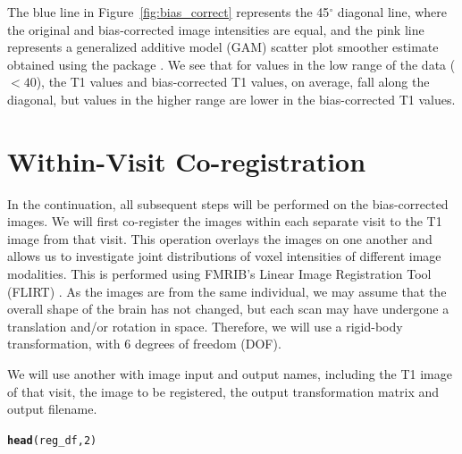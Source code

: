 \documentclass[a4paper]{report}\usepackage[]{graphicx}\usepackage[]{color}
\makeatletter
\newcommand{\hlnum}[1]{\textcolor[rgb]{0.686,0.059,0.569}{#1}}%
\newcommand{\hlstd}[1]{\textcolor[rgb]{0.345,0.345,0.345}{#1}}%
\newcommand{\hlkwd}[1]{\textcolor[rgb]{0.737,0.353,0.396}{\textbf{#1}}}%
\newenvironment{kframe}{%
 \def\at@end@of@kframe{}%
 \ifinner\ifhmode%
  \def\at@end@of@kframe{\end{minipage}}%
  \begin{minipage}{\columnwidth}%
 \fi\fi%
 \def\FrameCommand##1{\hskip\@totalleftmargin \hskip-\fboxsep
 \colorbox{shadecolor}{##1}\hskip-\fboxsep
     \hskip-\linewidth \hskip-\@totalleftmargin \hskip\columnwidth}%
 \MakeFramed {\advance\hsize-\width
   \@totalleftmargin\z@ \linewidth\hsize
   \@setminipage}}%
 {\par\unskip\endMakeFramed%
 \at@end@of@kframe}
\newenvironment{knitrout}{}{} %
\newcommand{\CRANpkg}[1]{\href{http://CRAN.R-project.org/package=#1}{\pkg{#1}}}%
\let\pkg=\strong
\DeclareRobustCommand\code{\bgroup\@noligs\@codex}
\makeatother
\begin{document}
\begin{article}
The blue line in Figure~\ref{fig:bias_correct}\protect{} represents the 45$^{\circ}$ diagonal line, where the original and bias-corrected image intensities are equal, and the pink line represents a generalized additive model (GAM) \citep{hastie_generalized_1990} scatter plot smoother estimate obtained using the \CRANpkg{mgcv} package \citep{wood_fast_2011}.  We see that for values in the low range of the data ($< 40$), the T1 values and bias-corrected T1 values, on average, fall along the diagonal, but values in the higher range are lower in the bias-corrected T1 values.






\section{Within-Visit Co-registration}
In the continuation, all subsequent steps will be performed on the bias-corrected images.  We will first co-register the images within each separate visit to the T1 image from that visit.  This operation overlays the images on one another and allows us to investigate joint distributions of voxel intensities of different image modalities.  This is performed using FMRIB's Linear Image Registration Tool (FLIRT) \citep{jenkinson_global_2001, jenkinson_improved_2002}.  As the images are from the same individual, we may assume that the overall shape of the brain has not changed, but each scan may have undergone a translation and/or rotation in space.  Therefore, we will use a rigid-body transformation, with $6$ degrees of freedom (DOF).  

We will use another \code{data.frame} with image input and output names, including the T1 image of that visit, the image to be registered, the output transformation matrix and output filename.


\begin{knitrout}
\color{fgcolor}\begin{kframe}
\begin{alltt}
\hlkwd{head}\hlstd{(reg_df,} \hlnum{2}\hlstd{)}
\end{alltt}
\end{kframe}
\end{knitrout}




\end{article}
\end{document}
